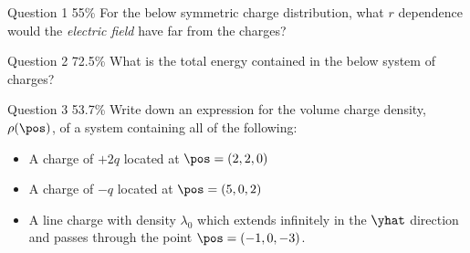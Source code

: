 \documentclass[pdf,aspectratio=169]{beamer}
\begin{document}
\begin{frame}{Question 1 \hspace{10cm}55\%}
	For the below symmetric charge distribution, what $r$ dependence would the \emph{electric field} have far from the charges?
	\begin{center}
	\end{center}
\end{frame}

\begin{frame}{Question 2 \hspace{10cm}72.5\%}
	What is the total energy contained in the below system of charges?
	\begin{center}
	\end{center}
\end{frame}

\begin{frame}{Question 3 \hspace{10cm} 53.7\%}
	Write down an expression for the volume charge density, $\rho(\pos)$, of a system containing all of the following:
	\begin{itemize}
		\item A charge of $+2q$ located at $\pos=(2,2,0)$
		\item A charge of $-q$ located at $\pos=(5,0,2)$
		\item A line charge with density $\lambda_0$ which extends infinitely in the $\yhat$ direction and passes through the point $\pos=(-1,0,-3)$.
	\end{itemize}
\end{frame}
\end{document}
